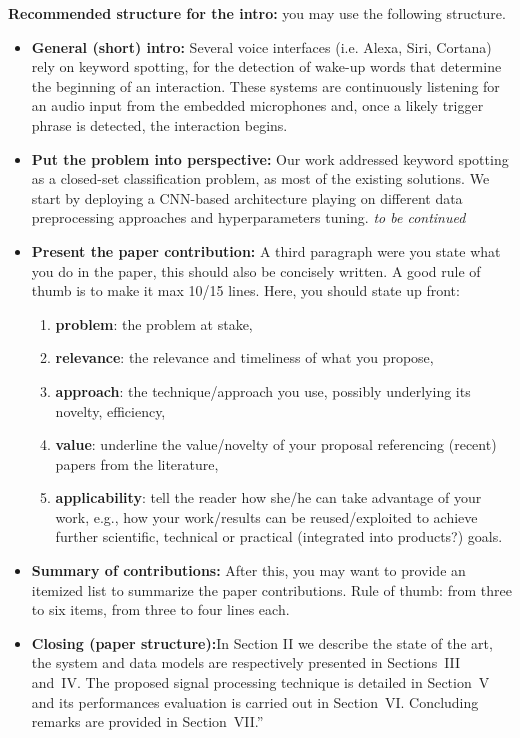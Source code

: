 \noindent \textbf{Recommended structure for the intro:} you may use the following structure. 
\begin{itemize}
\item \textbf{General (short) intro:} Several voice interfaces (i.e. Alexa, Siri, Cortana) rely on keyword spotting, for the detection of wake-up words that determine the beginning of an interaction. These systems are continuously listening for an audio input from the embedded microphones and, once a likely trigger phrase is detected, the interaction begins. 
\item \textbf{Put the problem into perspective:}  Our work addressed keyword spotting as a closed-set classification problem, as most of the existing solutions. We start by deploying a CNN-based architecture playing on different data preprocessing approaches and hyperparameters tuning. {\it to be continued}
\item \textbf{Present the paper contribution:} A third paragraph were you state what you do in the paper, this should also be concisely written. A good rule of thumb is to make it max 10/15 lines. Here, you should state up front:
\begin{enumerate}
\item \textbf{problem}: the problem at stake, 
\item \textbf{relevance}: the relevance and timeliness of what you propose, 
\item \textbf{approach}: the technique/approach you use, possibly underlying its novelty, efficiency, 
\item \textbf{value}: underline the value/novelty of your proposal referencing (recent) papers from the literature,
\item \textbf{applicability}: tell the reader how she/he can take advantage of your work, e.g., how your work/results can be reused/exploited to achieve further scientific, technical or practical (integrated into products?) goals.
\end{enumerate}
\item \textbf{Summary of contributions:} After this, you may want to provide an itemized list to summarize the paper contributions. Rule of thumb: from three to six items, from three to four lines each.
\item \textbf{Closing (paper structure):}In Section II we describe the state of the art, the system and data models are respectively presented in Sections~III and~IV. The proposed signal processing technique is detailed in Section~V and its performances evaluation is carried out in Section~VI. Concluding remarks are provided in Section~VII.''
\end{itemize}


